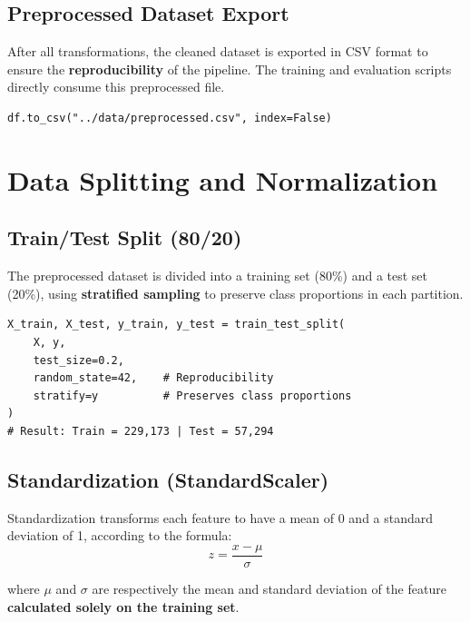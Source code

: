 \subsection{Preprocessed Dataset Export}

After all transformations, the cleaned dataset is exported in CSV format to ensure the \textbf{reproducibility} of the pipeline. The training and evaluation scripts directly consume this preprocessed file.

\begin{lstlisting}[caption={Preprocessed dataset export}]
df.to_csv("../data/preprocessed.csv", index=False)
\end{lstlisting}

\section{Data Splitting and Normalization}

\subsection{Train/Test Split (80/20)}

The preprocessed dataset is divided into a training set (80\%) and a test set (20\%), using \textbf{stratified sampling} to preserve class proportions in each partition.

\begin{lstlisting}[caption={Stratified dataset splitting}]
X_train, X_test, y_train, y_test = train_test_split(
    X, y,
    test_size=0.2,
    random_state=42,    # Reproducibility
    stratify=y          # Preserves class proportions
)
# Result: Train = 229,173 | Test = 57,294
\end{lstlisting}

\subsection{Standardization (StandardScaler)}
\label{sec:standardscaler}

Standardization transforms each feature to have a mean of 0 and a standard deviation of 1, according to the formula:
\begin{equation}
    z = \frac{x - \mu}{\sigma}
\end{equation}

\noindent where $\mu$ and $\sigma$ are respectively the mean and standard deviation of the feature \textbf{calculated solely on the training set}.

